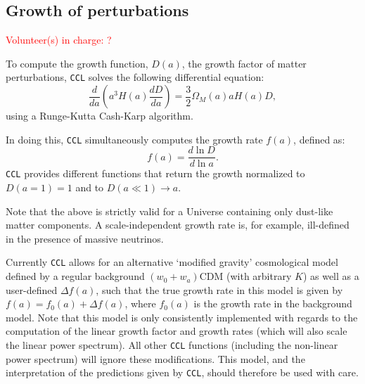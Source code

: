 \documentclass[\docopts]{\docclass}
\newcommand{\vol}[1]{\textcolor{red}{Volunteer(s) in charge: #1}}
\newcommand{\ccl}{{\tt CCL}\xspace}
\begin{document}

\subsection{Growth of perturbations}
\vol{?}

To compute the growth function, $D(a)$, the growth factor of matter perturbations, \ccl solves the following differential equation:
\begin{equation}
  \frac{d}{da}\left(a^3H(a)\frac{dD}{da}\right)=\frac{3}{2}\Omega_M(a)aH(a)D,
\end{equation}
using a Runge-Kutta Cash-Karp algorithm.

In doing this, \ccl simultaneously computes the growth rate $f(a)$, defined as:
\begin{equation}
  f(a)=\frac{d\ln D}{d\ln a}.
\end{equation}
\ccl provides different functions that return the growth normalized to $D(a=1)=1$ and to $D(a\ll1)\rightarrow a$.

Note that the above is strictly valid for a Universe containing only dust-like matter components. A scale-independent growth rate is, for example, ill-defined in the presence of massive neutrinos.

Currently \ccl allows for an alternative `modified gravity' cosmological model defined by a regular background $(w_0+w_a)$CDM (with arbitrary $K$) as well as a user-defined $\Delta f(a)$, such that the true growth rate in this model is given by $f(a)=f_0(a)+\Delta f(a)$, where $f_0(a)$ is the growth rate in the background model. Note that this model is only consistently implemented with regards to the computation of the linear growth factor and growth rates (which will also scale the linear power spectrum). All other \ccl functions (including the non-linear power spectrum) will ignore these modifications. This model, and the interpretation of the predictions given by \ccl, should therefore be used with care.
\end{document}
